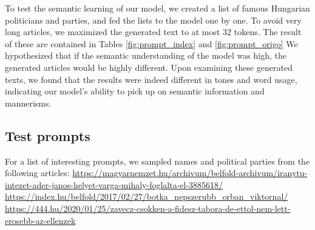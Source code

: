 \documentclass[journal]{IEEEtai}
\begin{document}
To test the semantic learning of our model, we created a list of famous Hungarian politicians and parties, and fed the lists to the model one by one. To avoid very long articles, we maximized the generated text to at most 32 tokens. The result of these are contained in Tables \ref{fig:prompt_index} and \ref{fig:prompt_origo} We hypothesized that if the semantic understanding of the model was high, the generated articles would be highly different. Upon examining these generated texts, we found that the results were indeed different in tones and word usage, indicating our model's ability to pick up on semantic information and mannerisms.

\subsection{Test prompts}
For a list of interesting prompts, we sampled names and political parties from the following articles:
\url{https://magyarnemzet.hu/archivum/belfold-archivum/iranytu-intezet-ader-janos-helyet-varga-mihaly-foglalta-el-3885618/} \\
\url{https://index.hu/belfold/2017/02/27/botka_nepszerubb_orban_viktornal/} \\
\url{https://444.hu/2020/01/25/zavecz-csokken-a-fidesz-tabora-de-ettol-nem-lett-erosebb-az-ellenzek} \\
\end{document}
